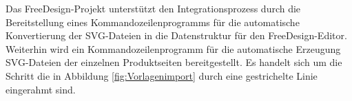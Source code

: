 Das FreeDesign-Projekt unterstützt den Integrationsprozess durch die Bereitstellung eines Kommandozeilenprogramms für die automatische Konvertierung der SVG-Dateien in die Datenstruktur für den FreeDesign-Editor. Weiterhin wird ein Kommandozeilenprogramm für die automatische Erzeugung SVG-Dateien der einzelnen Produktseiten bereitgestellt. Es handelt sich um die Schritt die in Abbildung \ref{fig:Vorlagenimport} durch eine gestrichelte Linie eingerahmt sind. 